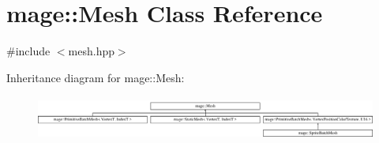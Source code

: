 \hypertarget{classmage_1_1_mesh}{}\section{mage\+:\+:Mesh Class Reference}
\label{classmage_1_1_mesh}


{\ttfamily \#include $<$mesh.\+hpp$>$}

Inheritance diagram for mage\+:\+:Mesh\+:\begin{figure}[H]
\begin{center}
\leavevmode
\includegraphics[height=1.489362cm]{classmage_1_1_mesh}
\end{center}
\end{figure}
